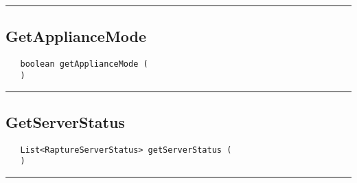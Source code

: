 \rule{15cm}{2pt}
\subsection{GetApplianceMode}
\label{Api:GetApplianceMode}
\begin{verbatim}
   boolean getApplianceMode (
   )
\end{verbatim}



\rule{15cm}{2pt}
\subsection{GetServerStatus}
\label{Api:GetServerStatus}
\begin{verbatim}
   List<RaptureServerStatus> getServerStatus (
   )
\end{verbatim}



\rule{15cm}{2pt}
